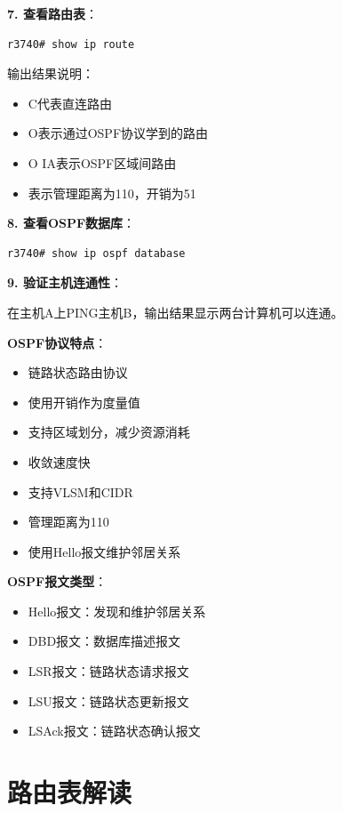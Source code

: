 \documentclass[12pt,a4paper]{ctexart}
\begin{document}
\begin{cmdbox}
\textbf{7. 查看路由表}：
\begin{lstlisting}
r3740# show ip route
\end{lstlisting}

输出结果说明：
\begin{itemize}[itemsep=0pt]
    \item C代表直连路由
    \item O表示通过OSPF协议学到的路由
    \item O IA表示OSPF区域间路由
    \item [110/51]表示管理距离为110，开销为51
\end{itemize}

\textbf{8. 查看OSPF数据库}：
\begin{lstlisting}
r3740# show ip ospf database
\end{lstlisting}

\textbf{9. 验证主机连通性}：

在主机A上PING主机B，输出结果显示两台计算机可以连通。
\end{cmdbox}

\begin{keybox}
\textbf{OSPF协议特点}：

\begin{itemize}[itemsep=0pt]
    \item 链路状态路由协议
    \item 使用开销作为度量值
    \item 支持区域划分，减少资源消耗
    \item 收敛速度快
    \item 支持VLSM和CIDR
    \item 管理距离为110
    \item 使用Hello报文维护邻居关系
\end{itemize}

\textbf{OSPF报文类型}：
\begin{itemize}[itemsep=0pt]
    \item Hello报文：发现和维护邻居关系
    \item DBD报文：数据库描述报文
    \item LSR报文：链路状态请求报文
    \item LSU报文：链路状态更新报文
    \item LSAck报文：链路状态确认报文
\end{itemize}
\end{keybox}

\section{路由表解读}
\end{document}
